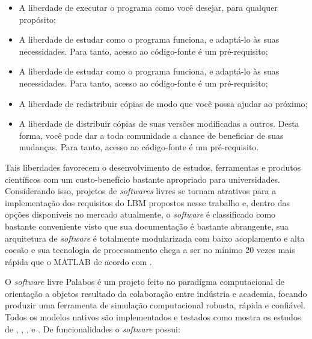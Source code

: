 \begin{itemize}
  \item A liberdade de executar o programa como você desejar, para qualquer propósito;
  \item A liberdade de estudar como o programa funciona, e adaptá-lo às suas necessidades. Para tanto, acesso ao código-fonte é um pré-requisito;
  \item A liberdade de estudar como o programa funciona, e adaptá-lo às suas necessidades. Para tanto, acesso ao código-fonte é um pré-requisito;
  \item A liberdade de redistribuir cópias de modo que você possa ajudar ao próximo;
  \item A liberdade de distribuir cópias de suas versões modificadas a outros. Desta forma, você pode dar a toda comunidade a chance de beneficiar de suas mudanças. Para tanto, acesso ao código-fonte é um pré-requisito.
\end{itemize}

Tais liberdades favorecem o desenvolvimento de estudos, ferramentas e produtos científicos com um custo-benefício bastante apropriado para universidades. Considerando isso, projetos de \textit{softwares} livres se tornam atrativos para a implementação dos requisitos do LBM propostos nesse trabalho e, dentro das opções disponíveis no mercado atualmente, o \textit{software}  é classificado como bastante conveniente visto que sua documentação é bastante abrangente, sua arquitetura de \textit{software} é totalmente modularizada com baixo acoplamento e alta coesão e sua tecnologia de processamento chega a ser no mínimo 20 vezes mais rápida que o MATLAB de acordo com .   

O \textit{software} livre Palabos é um projeto feito no paradígma computacional de orientação a objetos resultado da colaboração entre indústria e academia, focando produzir uma ferramenta de simulação computacional robusta, rápida e confiável. Todos os modelos nativos são implementados e testados como mostra os estudos de , , ,  e . De funcionalidades o \textit{software} possui:


